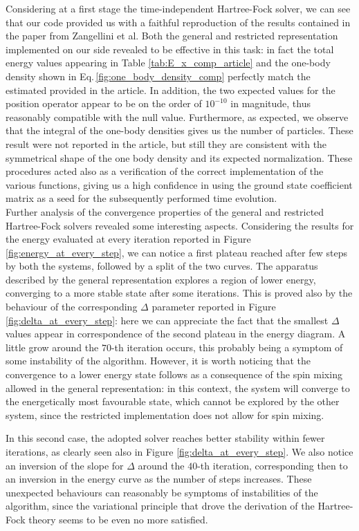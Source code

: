 Considering at a first stage the time-independent Hartree-Fock solver, we can see that our code provided us with a faithful reproduction of the results contained in the paper from Zangellini et al. Both the general and restricted representation implemented on our side revealed to be effective in this task: in fact the total energy values appearing in Table \ref{tab:E_x_comp_article} and the one-body density shown in Eq.\,\ref{fig:one_body_density_comp} perfectly match the estimated provided in the article. In addition, the two expected values for the position operator appear to be on the order of $10^{-10}$ in magnitude, thus reasonably compatible with the null value. Furthermore, as expected, we observe that the integral of the one-body densities gives us the number of particles. These result were not reported in the article, but still they are consistent with the symmetrical shape of the one body density and its expected normalization. These procedures acted also as a verification of the correct implementation of the various functions, giving us a high confidence in using the ground state coefficient matrix as a seed for the subsequently performed time evolution.\\

Further analysis of the convergence properties of the general and restricted Hartree-Fock solvers revealed some interesting aspects. Considering the results for the energy evaluated at every iteration reported in Figure \ref{fig:energy_at_every_step}, we can notice a first plateau reached after few steps by both the systems, followed by a split of the two curves. The apparatus described by the general representation explores a region of lower energy, converging to a more stable state after some iterations. This is proved also by the behaviour of the corresponding $\Delta$ parameter reported in Figure \ref{fig:delta_at_every_step}: here we can appreciate the fact that the smallest $\Delta$ values appear in correspondence of the second plateau in the energy diagram. A little grow around the $70$-th iteration occurs, this probably being a symptom of some instability of the algorithm. However, it is worth noticing that the convergence to a lower energy state follows as a consequence of the spin mixing allowed in the general representation: in this context, the system will converge to the energetically most favourable state, which cannot be explored by the other system, since the restricted implementation does not allow for spin mixing. 

In this second case, the adopted solver reaches better stability within fewer iterations, as clearly seen also in Figure \ref{fig:delta_at_every_step}. We also notice an inversion of the slope for $\Delta$ around the $40$-th iteration, corresponding then to an inversion in the energy curve as the number of steps increases. These unexpected behaviours can reasonably be symptoms of instabilities of the algorithm, since the variational principle that drove the derivation of the Hartree-Fock theory seems to be even no more satisfied. 

